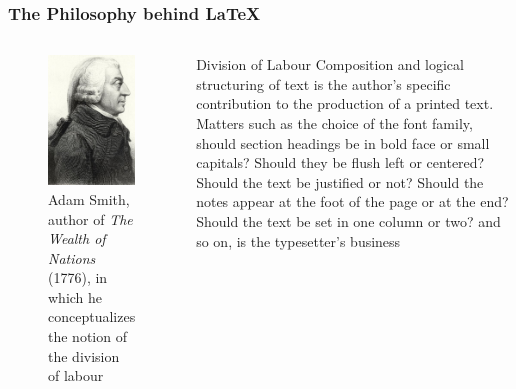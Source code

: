 \documentclass[10pt]{beamer}
\begin{document}
\begin{frame}\frametitle{The Philosophy behind \LaTeX}
\begin{columns}[c] %

\begin{figure}[h!]
\centering
\includegraphics[scale=0.6, keepaspectratio]{./smith}
\small
\caption{Adam Smith, author of \textit{The Wealth of Nations} (1776), in which he conceptualizes the notion of the division of labour}
\label{fig:smith}
\end{figure}

\small
\begin{block}{Division of Labour}
Composition and logical structuring of text is the author's specific contribution to the production of a printed text. Matters such as the choice of the font family, should section headings be in bold face or small capitals? Should they be flush left or centered? Should the text be justified or not? Should the notes appear at the foot of the page or at the end? Should the text be set in one column or two? and so on, is the typesetter's business
\end{block}
\end{columns}

\end{frame}
\end{document}
